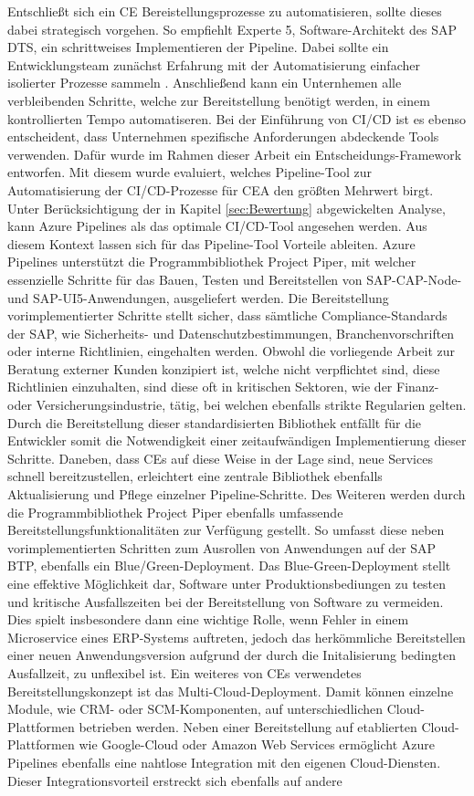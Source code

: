 Entschließt sich ein CE Bereistellungsprozesse zu automatisieren, sollte dieses dabei strategisch vorgehen. So empfiehlt Experte 5, Software-Architekt des SAP DTS, ein schrittweises Implementieren der Pipeline. Dabei sollte ein Entwicklungsteam zunächst Erfahrung mit der Automatisierung einfacher isolierter Prozesse sammeln \cite[Z. 8 ff.]{SoftwareArchitektSAPDTSIntegration.}. Anschließend kann ein Unternhemen alle verbleibenden Schritte, welche zur Bereitstellung benötigt werden, in einem kontrollierten Tempo automatiseren. Bei der Einführung von CI/CD ist es ebenso entscheident, dass Unternehmen spezifische Anforderungen abdeckende Tools verwenden. Dafür wurde im Rahmen dieser Arbeit ein Entscheidungs-Framework entworfen. Mit diesem wurde evaluiert, welches Pipeline-Tool zur Automatisierung der CI/CD-Prozesse für CEA den größten Mehrwert birgt. Unter Berücksichtigung der in Kapitel \ref{sec:Bewertung} abgewickelten Analyse, kann Azure Pipelines als das optimale CI/CD-Tool angesehen werden. Aus diesem Kontext lassen sich für das Pipeline-Tool Vorteile ableiten. Azure Pipelines unterstützt die Programmbibliothek Project Piper, mit welcher essenzielle Schritte für das Bauen, Testen und Bereitstellen von SAP-CAP-Node- und SAP-UI5-Anwendungen, ausgeliefert werden. Die Bereitstellung vorimplementierter Schritte stellt sicher, dass sämtliche Compliance-Standards der SAP, wie Sicherheits- und Datenschutzbestimmungen, Branchenvorschriften oder interne Richtlinien, eingehalten werden. Obwohl die vorliegende Arbeit zur Beratung externer Kunden konzipiert ist, welche nicht verpflichtet sind, diese Richtlinien einzuhalten, sind diese oft in kritischen Sektoren, wie der Finanz- oder Versicherungsindustrie, tätig, bei welchen ebenfalls strikte Regularien gelten. Durch die Bereitstellung dieser standardisierten Bibliothek entfällt für die Entwickler somit die Notwendigkeit einer zeitaufwändigen Implementierung dieser Schritte. Daneben, dass CEs auf diese Weise in der Lage sind, neue Services schnell bereitzustellen, erleichtert eine zentrale Bibliothek ebenfalls Aktualisierung und Pflege einzelner Pipeline-Schritte. Des Weiteren werden durch die Programmbibliothek Project Piper ebenfalls umfassende Bereitstellungsfunktionalitäten zur Verfügung gestellt. So umfasst diese neben vorimplementierten Schritten zum Ausrollen von Anwendungen auf der SAP BTP, ebenfalls ein Blue/Green-Deployment. Das Blue-Green-Deployment stellt eine effektive Möglichkeit dar, Software unter Produktionsbediungen zu testen und kritische Ausfallszeiten bei der Bereitstellung von Software zu vermeiden. Dies spielt insbesondere dann eine wichtige Rolle, wenn Fehler in einem Microservice eines ERP-Systems auftreten, jedoch das herkömmliche Bereitstellen einer neuen Anwendungsversion aufgrund der durch die Initalisierung bedingten Ausfallzeit, zu unflexibel ist. Ein weiteres von CEs verwendetes Bereitstellungskonzept ist das Multi-Cloud-Deployment. Damit können einzelne Module, wie CRM- oder SCM-Komponenten, auf unterschiedlichen Cloud-Plattformen betrieben werden. Neben einer Bereitstellung auf etablierten Cloud-Plattformen wie Google-Cloud oder Amazon Web Services ermöglicht Azure Pipelines ebenfalls eine nahtlose Integration mit den eigenen Cloud-Diensten. Dieser Integrationsvorteil erstreckt sich ebenfalls auf andere 